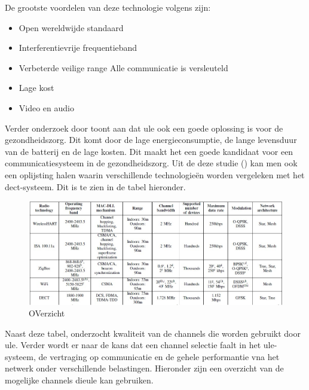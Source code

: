 De grootste voordelen van deze technologie volgens \textcite{GariniDil2014} zijn:

\begin{itemize}
  \item Open wereldwijde standaard
  \item Interferentievrije frequentieband
  \item Verbeterde veilige range
  \subitem Alle communicatie is versleuteld
  \item Lage kost
  \item Video en audio
\end{itemize}


Verder onderzoek door \textcite{Das2012} toont aan dat \gls{ule} ook een goede oplossing is voor de gezondheidszorg. Dit komt door de lage energieconsumptie, de lange levensduur van de batterij en de lage kosten. Dit maakt het een goede kandidaat voor een communicatiesysteem in de gezondheidszorg. Uit de deze studie (\textcite{Das2012}) kan men ook een oplijsting halen waarin verschillende technologieën worden vergeleken met het \gls{dect}-systeem. Dit is te zien in de tabel hieronder.

\begin{figure}[H]
  \includegraphics[width=\linewidth]{../graphics/overzicht.jpg}
  \caption{OVerzicht \autocite[Door][Copyright 2012 van]{Das2012} \citeauthor{Das2012}}
  \label{fig:overzicht}
\end{figure}


Naast deze tabel, onderzocht \textcite{Das2012} kwaliteit van de channels die worden gebruikt door \gls{ule}. Verder wordt er naar de kans dat een channel selectie faalt in het \gls{ule}-systeem, de vertraging op communicatie en de gehele performantie vna het netwerk onder verschillende belastingen. Hieronder zijn een overzicht van de mogelijke channels die\gls{ule} kan gebruiken.

